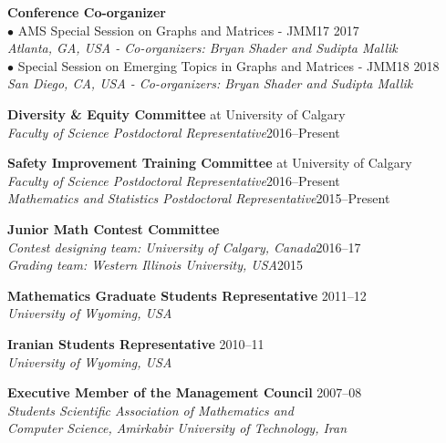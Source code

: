 \documentclass[margin,line,pifont,palatino,courier]{res}
\begin{document}
\begin{resume}
\begin{description}
\item \textbf{Conference Co-organizer} \\
	{\small $\bullet$ AMS Special Session on Graphs and Matrices - JMM17 \hfill  2017\\
		\phantom{----} {\small \sl Atlanta, GA, USA - Co-organizers: Bryan Shader and Sudipta Mallik}}\\
	{\small $\bullet$ Special Session on Emerging Topics in Graphs and Matrices - JMM18 \hfill  2018\\
		\phantom{----} {\small \sl San Diego, CA, USA - Co-organizers: Bryan Shader and Sudipta Mallik}}
		
\item \textbf{Diversity \& Equity Committee} at University of Calgary\\
	\phantom{----}  {\small \sl Faculty of Science Postdoctoral Representative}\hfill  2016--Present

\item \textbf{Safety Improvement Training Committee} at University of Calgary \\
	\phantom{----}  {\small \sl Faculty of Science Postdoctoral Representative}\hfill  2016--Present\\
	\phantom{----}  {\small \sl Mathematics and Statistics Postdoctoral Representative}\hfill  2015--Present

\item \textbf{Junior Math Contest Committee} \\
	\phantom{----}  {\small \sl Contest designing team: University of Calgary, Canada}\hfill  2016--17\\
	\phantom{----}  {\small \sl Grading team: Western Illinois University, USA}\hfill  2015

\item \textbf{Mathematics Graduate Students Representative} \hfill 2011--12 \\
	\phantom{----} {\small \sl University of Wyoming, USA}

\item \textbf{Iranian Students Representative} \hfill 2010--11 \\
	\phantom{----} {\small \sl University of Wyoming, USA}

\item \textbf{Executive Member of the Management Council} \hfill 2007--08\\
	\phantom{----} {\small \sl Students Scientific Association of Mathematics and \\Computer Science, Amirkabir University of Technology, Iran}
 

\end{description}
\end{resume}
\end{document}
